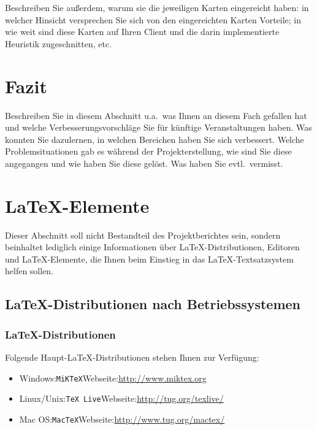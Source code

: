 \documentclass[12pt,a4paper]{article}
\begin{document}
Beschreiben Sie außerdem, warum sie die jeweiligen Karten eingereicht haben: in welcher Hinsicht versprechen Sie sich von den eingereichten Karten Vorteile; in wie weit sind diese Karten auf Ihren Client und die darin implementierte Heuristik zugeschnitten, etc.


\newpage
\section{Fazit}
Beschreiben Sie in diesem Abschnitt u.a.\ was Ihnen an diesem Fach gefallen hat und welche Verbesserungsvorschläge Sie für künftige Veranstaltungen haben. Was konnten Sie dazulernen, in welchen Bereichen haben Sie sich verbessert. Welche Problemsituationen gab es während der Projekterstellung, wie sind Sie diese angegangen und wie haben Sie diese gelöst. Was haben Sie evtl.\ vermisst.


\newpage
\section{\LaTeX-Elemente}
Dieser Abschnitt soll nicht Bestandteil des Projektberichtes sein, sondern beinhaltet lediglich einige Informationen über \LaTeX-Distributionen, Editoren und \LaTeX-Elemente, die Ihnen beim Einstieg in das \LaTeX-Textsatzsystem helfen sollen.

\subsection{\LaTeX-Distributionen nach Betriebssystemen}

\subsubsection{\LaTeX-Distributionen}
Folgende Haupt-\LaTeX-Distributionen stehen Ihnen zur Verfügung:
\begin{itemize}
  \item Windows:\quad \texttt{MiKTeX}\quad Webseite:\quad\url{http://www.miktex.org}
  \item Linux/Unix:\quad \texttt{TeX Live}\quad Webseite:\quad\url{http://tug.org/texlive/}
  \item Mac OS:\quad \texttt{MacTeX}\quad Webseite:\quad\url{http://www.tug.org/mactex/}
\end{itemize}
\end{document}
